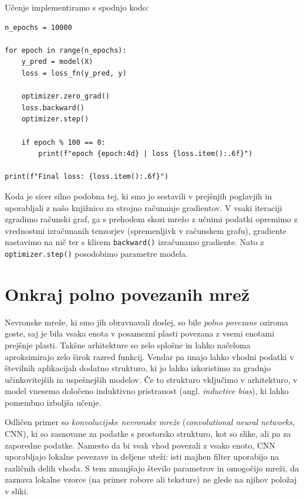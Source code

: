 Učenje implementiramo s spodnjo kodo:
\vspace*{3mm}
\begin{lstlisting}
n_epochs = 10000

for epoch in range(n_epochs):
    y_pred = model(X)
    loss = loss_fn(y_pred, y)

    optimizer.zero_grad()
    loss.backward()
    optimizer.step()

    if epoch % 100 == 0:
        print(f"epoch {epoch:4d} | loss {loss.item():.6f}")

print(f"Final loss: {loss.item():.6f}")
\end{lstlisting}
%
Koda je sicer silno podobna tej, ki smo jo sestavili v prejšnjih poglavjih in uporabljali z našo knjižnico za strojno računanje gradientov. V vsaki iteraciji zgradimo računski graf, ga s prehodom skozi mrežo z učnimi podatki opremimo z vrednostmi izračunanih tenzorjev (spremenljivk v računskem grafu), gradiente nastavimo na nič ter s klicem \texttt{backward()} izračunamo gradiente. Nato z \texttt{optimizer.step()} posodobimo parametre modela.

\section{Onkraj polno povezanih mrež}

Nevronske mreže, ki smo jih obravnavali doslej, so bile \emph{polno povezane} oziroma goste, saj je bila vsaka enota v posamezni plasti povezana z vsemi enotami prejšnje plasti. Takšne arhitekture so zelo splošne in lahko načeloma aproksimirajo zelo širok razred funkcij. Vendar pa imajo lahko vhodni podatki v številnih aplikacijah dodatno strukturo, ki jo lahko izkoristimo za gradnjo učinkovitejših in uspešnejših modelov. Če to strukturo vključimo v arhitekturo, v model vnesemo določeno induktivno pristranost (angl. {\em inductive bias}), ki lahko pomembno izboljša učenje.

Odličen primer so \emph{konvolucijske nevronske mreže} ({\em convolutional neural networks}, CNN),
%
%
ki so zasnovane za podatke s prostorsko strukturo, kot so slike, ali pa za zaporedne podatke. Namesto da bi vsak vhod povezali z vsako enoto, CNN uporabljajo lokalne povezave in deljene uteži: isti majhen filter uporabijo na različnih delih vhoda. S tem zmanjšajo število parametrov in omogočijo mreži, da zaznava lokalne vzorce (na primer robove ali teksture) ne glede na njihov položaj v sliki.

